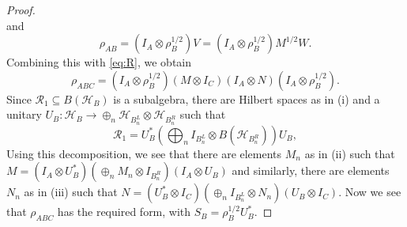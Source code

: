\documentclass[12pt]{article}
\theoremstyle{definition}
\theoremstyle{remark}
\def\Rr{\mathcal R}
\def\Ha{\mathcal H}
\begin{document}
\begin{proof}
\[\]
and 
\[
\rho_{AB}=(I_A\otimes \rho_B^{1/2})V=(I_A\otimes \rho_B^{1/2})M^{1/2}W.
\]
Combining this with \eqref{eq:R}, we obtain
\[
\rho_{ABC}=(I_A\otimes \rho_B^{1/2})(M\otimes I_C)(I_A\otimes N)(I_A\otimes \rho_B^{1/2}).
\]
Since $\Rr_1\subseteq B(\Ha_B)$ is a subalgebra, there are Hilbert spaces as in (i) and a
unitary $U_B:\Ha_B\to \oplus_n \Ha_{B^L_n}\otimes \Ha_{B^R_n}$ such that
\[
\Rr_1=U^*_B\left(\bigoplus_n I_{B^L_n}\otimes B(\Ha_{B^R_n})\right) U_B,
\]
Using this decomposition, we see that there are elements $M_n$ as in (ii) such that 
$M=(I_A\otimes U^*_B)(\oplus_n M_n\otimes I_{B^R_n})(I_A\otimes U_B)$ and similarly, there
are elements $N_n$ as in (iii) such that $N=(U_B^*\otimes I_C)(\oplus_n I_{B^L_n}\otimes
N_n)(U_B\otimes I_C)$. Now we see that $\rho_{ABC}$ has the required form, with
$S_B=\rho^{1/2}_BU^*_B$.


\end{proof}




\end{document}
